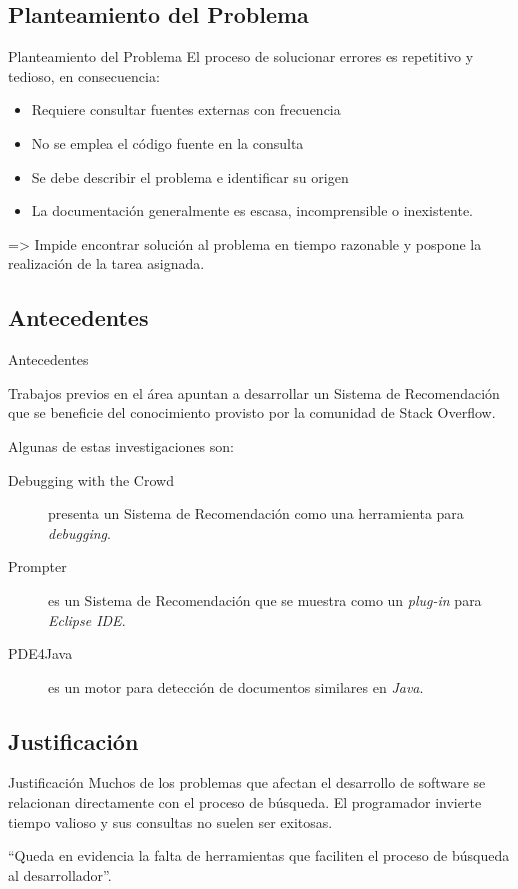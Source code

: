 \documentclass{beamer}
\begin{document}
\subsection{Planteamiento del Problema}
\begin{frame}{Planteamiento del Problema}
El proceso de solucionar errores es repetitivo y tedioso, en consecuencia:
\begin{itemize}
  \item Requiere consultar fuentes externas con frecuencia
  \item No se emplea el código fuente en la consulta
  \item Se debe describir el problema e identificar su origen
  \item La documentación generalmente es escasa, incomprensible o inexistente.
\end{itemize}
\begin{center}
=> Impide encontrar solución al problema en tiempo razonable y pospone la realización de la tarea asignada.
\end{center}
\end{frame}

\subsection*{Antecedentes}
\begin{frame}{Antecedentes}
\begin{center}
Trabajos previos en el área apuntan a desarrollar un Sistema de Recomendación que
se beneficie del conocimiento provisto por la comunidad de Stack Overflow.
\end{center}
Algunas de estas investigaciones son:
\begin{description}
  \item[Debugging with the Crowd] presenta un Sistema de Recomendación como una herramienta para \textit{debugging}.
  \item[Prompter] es un Sistema de Recomendación que se muestra como un \textit{plug-in} para \textit{Eclipse IDE}.
  \item[PDE4Java] es un motor para detección de documentos similares en \textit{Java}.
\end{description}
\end{frame}

\subsection{Justificación}
\begin{frame}{Justificación}
Muchos de los problemas que afectan el desarrollo de software se relacionan directamente con el proceso de búsqueda.
El programador invierte tiempo valioso y sus consultas no suelen ser exitosas.

\begin{center}
``Queda en evidencia la falta de herramientas que faciliten el proceso de búsqueda al desarrollador''.
\end{center}
\end{frame}
\end{document}

